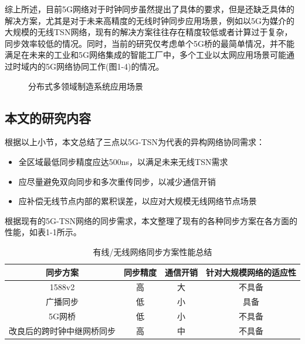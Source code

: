 \documentclass[UTF8,a4paper,12pt]{ctexart}
\numberwithin{equation}{section}
\begin{document}
综上所述，目前5G网络对于时钟同步虽然提出了具体的要求，但是还缺乏具体的解决方案，尤其是对于未来高精度的无线时钟同步应用场景，例如以5G为媒介的大规模的无线TSN网络，现有的解决方案往往存在精度较低或者计算过于复杂，同步效率较低的情况。同时，当前的研究仅考虑单个5G桥的最简单情况\cite{9557468}，并不能满足在未来的工业和5G网络集成的智能工厂中，多个工业以太网应用场景可能通过时域内的5G网络协同工作\cite{8402373}(图1-4)的情况。
\begin{figure}[htb] 
	\caption{分布式多领域制造系统应用场景}
\end{figure}

\subsection{本文的研究内容}
根据以上小节，本文总结了三点以5G-TSN为代表的异构网络协同需求：
\begin{itemize}
	\item 全区域最低同步精度应达500ns，以满足未来无线TSN需求
	\item 应尽量避免双向同步和多次重传同步，以减少通信开销
	\item 应补偿无线节点内部的累积误差，以应对大规模无线网络节点场景
\end{itemize}
根据现有的5G-TSN网络的同步需求，本文整理了现有的各种同步方案在各方面的性能，如表1-1所示。
\begin{table}[!htbp]
	\centering
	\caption{有线/无线网络同步方案性能总结}
	\begin{tabular}{|c| c|c|c|}
		\hline
\textbf{同步方案}   &\textbf{同步精度}  & \textbf{通信开销}  & \textbf{针对大规模网络的适应性}  \\
\hline
1588v2    & 高   & 大    & 不具备                \\
\hline
广播同步 &  低 &  小 & 具备   \\
\hline
5G网桥 &低   &小     &不具备  \\
\hline
改良后的跨时钟中继网桥同步 &高  & 中        & 不具备    \\
\hline
	\end{tabular}
\end{table}
\end{document}
